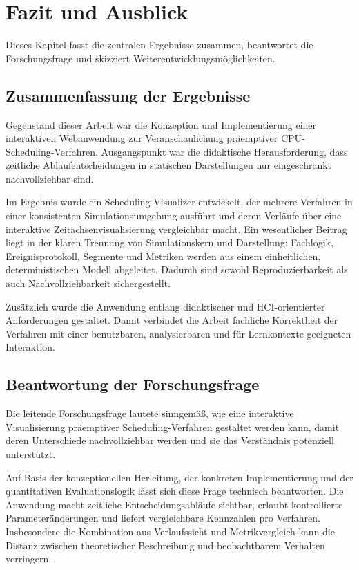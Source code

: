 \chapter{Fazit und Ausblick}

Dieses Kapitel fasst die zentralen Ergebnisse zusammen, beantwortet die Forschungsfrage und skizziert Weiterentwicklungsmöglichkeiten.

\section{Zusammenfassung der Ergebnisse}

Gegenstand dieser Arbeit war die Konzeption und Implementierung einer interaktiven Webanwendung zur Veranschaulichung präemptiver CPU-Scheduling-Verfahren. Ausgangspunkt war die didaktische Herausforderung, dass zeitliche Ablaufentscheidungen in statischen Darstellungen nur eingeschränkt nachvollziehbar sind.

Im Ergebnis wurde ein Scheduling-Visualizer entwickelt, der mehrere Verfahren in einer konsistenten Simulationsumgebung ausführt und deren Verläufe über eine interaktive Zeitachsenvisualisierung vergleichbar macht. Ein wesentlicher Beitrag liegt in der klaren Trennung von Simulationskern und Darstellung: Fachlogik, Ereignisprotokoll, Segmente und Metriken werden aus einem einheitlichen, deterministischen Modell abgeleitet. Dadurch sind sowohl Reproduzierbarkeit als auch Nachvollziehbarkeit sichergestellt.

Zusätzlich wurde die Anwendung entlang didaktischer und HCI-orientierter Anforderungen gestaltet. Damit verbindet die Arbeit fachliche Korrektheit der Verfahren mit einer benutzbaren, analysierbaren und für Lernkontexte geeigneten Interaktion.

\section{Beantwortung der Forschungsfrage}

Die leitende Forschungsfrage lautete sinngemäß, wie eine interaktive Visualisierung präemptiver Scheduling-Verfahren gestaltet werden kann, damit deren Unterschiede nachvollziehbar werden und sie das Verständnis potenziell unterstützt.

Auf Basis der konzeptionellen Herleitung, der konkreten Implementierung und der quantitativen Evaluationslogik lässt sich diese Frage technisch beantworten. Die Anwendung macht zeitliche Entscheidungsabläufe sichtbar, erlaubt kontrollierte Parameteränderungen und liefert vergleichbare Kennzahlen pro Verfahren. Insbesondere die Kombination aus Verlaufssicht und Metrikvergleich kann die Distanz zwischen theoretischer Beschreibung und beobachtbarem Verhalten verringern.

